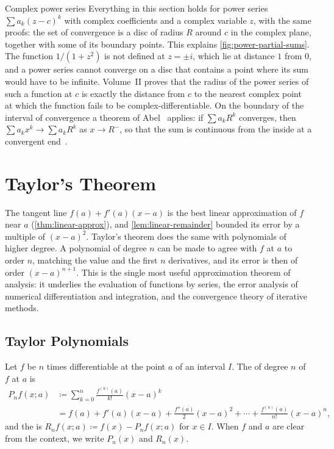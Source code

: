 \begin{note}{Complex power series}
Everything in this section holds for power series $\sum a_k(z-c)^k$ with complex coefficients and a complex variable $z$, with the same proofs: the set of convergence is a disc of radius $R$ around $c$ in the complex plane, together with some of its boundary points. This explains \cref{fig:power-partial-sums}. The function $1/(1+z^2)$ is not defined at $z=\pm i$, which lie at distance $1$ from $0$, and a power series cannot converge on a disc that contains a point where its sum would have to be infinite. Volume~II proves that the radius of the power series of such a function at $c$ is exactly the distance from $c$ to the nearest complex point at which the function fails to be complex-differentiable. On the boundary of the interval of convergence a theorem of Abel~\cite{abel1826} applies: if $\sum a_kR^k$ converges, then $\sum a_kx^k\to\sum a_kR^k$ as $x\to R^-$, so that the sum is continuous from the inside at a convergent end~\cite{knopp1990}.
\end{note}

\section{Taylor's Theorem}
\label{sec:taylor}

The tangent line $f(a)+f'(a)(x-a)$ is the best linear approximation of $f$ near $a$ (\cref{thm:linear-approx}), and \cref{lem:linear-remainder} bounded its error by a multiple of $(x-a)^2$. Taylor's theorem does the same with polynomials of higher degree. A polynomial of degree $n$ can be made to agree with $f$ at $a$ to order $n$, matching the value and the first $n$ derivatives, and its error is then of order $(x-a)^{n+1}$. This is the single most useful approximation theorem of analysis: it underlies the evaluation of functions by series, the error analysis of numerical differentiation and integration, and the convergence theory of iterative methods.

\subsection{Taylor Polynomials}

\begin{definition}
\label{def:taylor-polynomial}
Let $f$ be $n$ times differentiable at the point $a$ of an interval $I$. The  of degree $n$ of $f$ at $a$ is
\begin{align*}
P_nf(x;a)&\coloneqq\sum_{k=0}^n\frac{f^{(k)}(a)}{k!}(x-a)^k\\
&=f(a)+f'(a)(x-a)+\frac{f''(a)}2(x-a)^2+\cdots+\frac{f^{(n)}(a)}{n!}(x-a)^n,
\end{align*}
and the  is $R_nf(x;a)\coloneqq f(x)-P_nf(x;a)$ for $x\in I$. When $f$ and $a$ are clear from the context, we write $P_n(x)$ and $R_n(x)$.
\end{definition}

